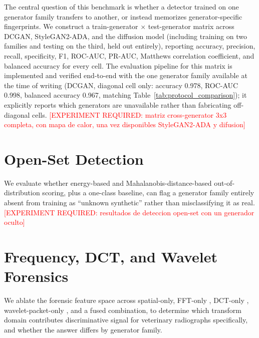 \documentclass[journal]{IEEEtran}
\newcommand{\pending}[1]{\textcolor{red}{[EXPERIMENT REQUIRED: #1]}}
\begin{document}
The central question of this benchmark is whether a detector trained on one generator family transfers to another, or instead memorizes generator-specific fingerprints. We construct a train-generator $\times$ test-generator matrix across DCGAN, StyleGAN2-ADA, and the diffusion model (including training on two families and testing on the third, held out entirely), reporting accuracy, precision, recall, specificity, F1, ROC-AUC, PR-AUC, Matthews correlation coefficient, and balanced accuracy for every cell. The evaluation pipeline for this matrix is implemented and verified end-to-end with the one generator family available at the time of writing (DCGAN, diagonal cell only: accuracy 0.978, ROC-AUC 0.998, balanced accuracy 0.967, matching Table~\ref{tab:protocol_comparison}); it explicitly reports which generators are unavailable rather than fabricating off-diagonal cells. \pending{matriz cross-generator 3x3 completa, con mapa de calor, una vez disponibles StyleGAN2-ADA y difusion}

\section{Open-Set Detection}
\label{sec:open_set}

We evaluate whether energy-based \cite{energy_ood_2020} and Mahalanobis-distance-based \cite{mahalanobis_ood_2018} out-of-distribution scoring, plus a one-class baseline, can flag a generator family entirely absent from training as ``unknown synthetic'' rather than misclassifying it as real. \pending{resultados de deteccion open-set con un generador oculto}

\section{Frequency, DCT, and Wavelet Forensics}
\label{sec:frequency_forensics}

We ablate the forensic feature space across spatial-only, FFT-only \cite{frequency_checkerboard_2021,freq_analysis_2020}, DCT-only \cite{dct_traces_2024}, wavelet-packet-only \cite{wavelet_deepfake_2022}, and a fused combination, to determine which transform domain contributes discriminative signal for veterinary radiographs specifically, and whether the answer differs by generator family.
\end{document}
